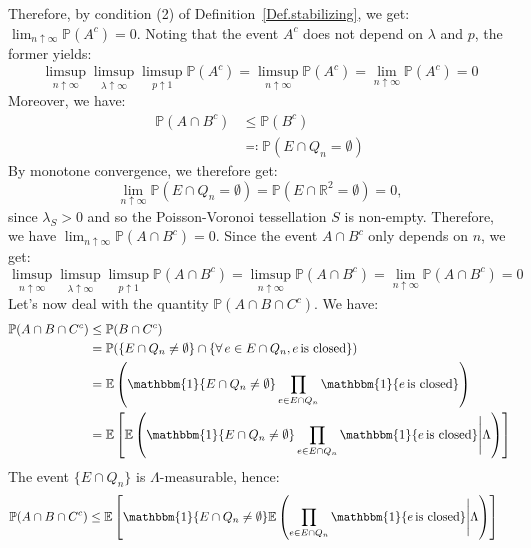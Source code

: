 \documentclass[10pt,a4paper]{amsart}
\theoremstyle{exampstyle}
\theoremstyle{exampnotations}
\begin{document}
Therefore, by condition (2) of Definition~\ref{Def.stabilizing}, we get: $\lim_{n \uparrow \infty} \mathbb{P}(A^c) = 0$. Noting that the event $A^c$ does not depend on $\lambda$ and $p$, the former yields:
\begin{equation}
    \label{eq13}
    \limsup_{n \uparrow \infty}\limsup_{\lambda \uparrow \infty}\limsup_{p \uparrow 1} \mathbb{P}(A^c) = \limsup_{n \uparrow \infty} \mathbb{P}(A^c)= \lim_{n \uparrow \infty} \mathbb{P}(A^c) = 0
\end{equation}
Moreover, we have: 
\begin{align*}
    \mathbb{P}(A \cap B^c) & \leq \mathbb{P}(B^c)
    \\ & \eqqcolon \mathbb{P}(E \cap Q_n = \emptyset)
\end{align*}
By monotone convergence, we therefore get:
\begin{equation*}
    \lim_{n \uparrow \infty}\mathbb{P}(E \cap Q_n = \emptyset) = \mathbb{P}(E \cap \mathbb{R}^{2} = \emptyset) = 0,
\end{equation*}
since $\lambda_S > 0$ and so the Poisson-Voronoi tessellation $S$ is non-empty. Therefore, we have $\lim_{n \uparrow \infty}\mathbb{P}(A \cap B^c) = 0$. Since the event $A \cap B^c$ only depends on $n$, we get:
\begin{equation}
    \label{eq14}
    \limsup_{n \uparrow \infty}\limsup_{\lambda \uparrow \infty}\limsup_{p \uparrow 1}\mathbb{P}(A \cap B^c) = \limsup_{n \uparrow \infty}\mathbb{P}(A \cap B^c)= \lim_{n \uparrow \infty}\mathbb{P}(A \cap B^c) = 0
\end{equation}
Let's now deal with the quantity $\mathbb{P}(A \cap B \cap C^c)$. We have:
\begin{align*}
    \mathbb{P}(A \cap B \cap C^c) &\leq \mathbb{P}(B \cap C^c)
    \\ &= \mathbb{P}(\lbrace E \cap Q_n \neq \emptyset \rbrace \cap \lbrace \forall \, e \in E \cap Q_n, e \, \text{is closed} \rbrace)
    \\ &= \mathbb{E}\left( \mathbbm{1}\lbrace E \cap Q_n \neq \emptyset \rbrace \prod_{e \in E \cap Q_n} \mathbbm{1} \lbrace e \, \text{is closed} \rbrace \right)
    \\ &= \mathbb{E}\left[\mathbb{E}\left(\mathbbm{1}\lbrace E \cap Q_n \neq \emptyset \rbrace \prod_{e \in E \cap Q_n} \mathbbm{1} \lbrace e \, \text{is closed} \rbrace \Bigg\vert \Lambda \right)\right]
\end{align*}
The event $\lbrace E \cap Q_n \rbrace$ is $\Lambda$-measurable, hence:
\begin{align}
\label{eq15}
    \mathbb{P}(A \cap B \cap C^c) &\leq \mathbb{E}\left[\mathbbm{1}\lbrace E \cap Q_n \neq \emptyset \rbrace\mathbb{E}\left( \prod_{e \in E \cap Q_n} \mathbbm{1} \lbrace e \, \text{is closed} \rbrace \Bigg\vert \Lambda \right)\right]
\end{align}
\end{document}
